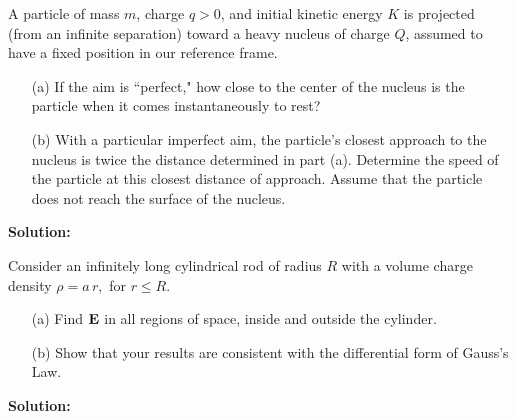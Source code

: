 \documentclass[11pt]{article}
\begin{document}
\vspace*{0.25in}


\begin{problem}[(P28.6)*]
A particle of mass $m$, charge $q>0$, and initial kinetic energy $K$ is projected (from an infinite separation) toward a heavy nucleus of charge $Q$, 
assumed to have a fixed position in our reference frame.
\begin{enumerate}
\item[(a) ]  If the aim is ``perfect," how close to the center of the nucleus is the particle when it comes instantaneously to rest?
\item[(b) ]  With a particular imperfect aim, the particle's closest approach to the nucleus is twice the distance determined in part (a). Determine the speed of the particle at this closest distance of approach. Assume that the particle does not reach the surface of the nucleus.
\end{enumerate}
\end{problem}


\textbf{Solution:}


\clearpage
\begin{problem}[2.]
Consider an infinitely long cylindrical rod of radius $R$ with a volume charge density $\rho = a\,r,$ for $r\leq R$.
\begin{enumerate}
\item[(a) ]  Find $\mathbf{E}$ in all regions of space, inside and outside the cylinder.
\item[(b) ]  Show that your results are consistent with the differential form of Gauss's Law.
\end{enumerate}
\end{problem}


\textbf{Solution:}


\clearpage
\end{document}
